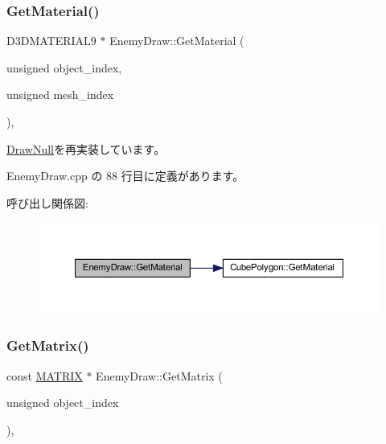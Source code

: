 \subsubsection{\texorpdfstring{Get\+Material()}{GetMaterial()}}
{\footnotesize\ttfamily D3\+D\+M\+A\+T\+E\+R\+I\+A\+L9 $\ast$ Enemy\+Draw\+::\+Get\+Material (\begin{DoxyParamCaption}\item[{unsigned}]{object\+\_\+index,  }\item[{unsigned}]{mesh\+\_\+index }\end{DoxyParamCaption})\hspace{0.3cm}{\ttfamily [override]}, {\ttfamily [virtual]}}



\mbox{\hyperlink{class_draw_null_a84969d22d3436986f214e9896fe44fc6}{Draw\+Null}}を再実装しています。



 Enemy\+Draw.\+cpp の 88 行目に定義があります。

呼び出し関係図\+:\nopagebreak
\begin{figure}[H]
\begin{center}
\leavevmode
\includegraphics[width=350pt]{class_enemy_draw_a12f00116f7fa97e07317a949d5c27bb4_cgraph}
\end{center}
\end{figure}
\mbox{\label{class_enemy_draw_a6f2a052a45caf0d255112cbe81b8bfa3}} 
\subsubsection{\texorpdfstring{Get\+Matrix()}{GetMatrix()}}
{\footnotesize\ttfamily const \mbox{\hyperlink{_vector3_d_8h_a032295cd9fb1b711757c90667278e744}{M\+A\+T\+R\+IX}} $\ast$ Enemy\+Draw\+::\+Get\+Matrix (\begin{DoxyParamCaption}\item[{unsigned}]{object\+\_\+index }\end{DoxyParamCaption})\hspace{0.3cm}{\ttfamily [override]}, {\ttfamily [virtual]}}



